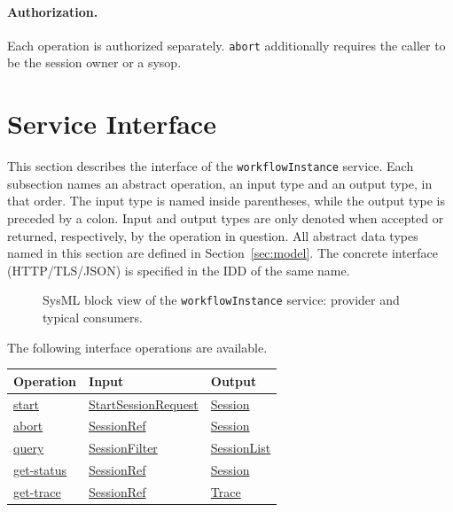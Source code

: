 \documentclass[a4paper]{arrowhead}
\newcommand{\mref}[1]{{\textcolor{ArrowheadPurple}{\hyperref[sec:model:#1]{#1}}}}
\newcommand{\oref}[1]{{\textcolor{ArrowheadBlue}{\hyperref[sec:operations:#1]{#1}}}}
\begin{document}
\paragraph{Authorization.} Each operation is authorized separately. \texttt{abort} additionally requires the caller to be the session owner or a sysop.

\newpage
\section{Service Interface}
\label{sec:operations}
This section describes the interface of the \texttt{workflow\allowbreak{}Instance} service. Each subsection names an abstract operation,
an input type and an output type, in that order. The input type is named inside parentheses, while the output type is
preceded by a colon. Input and output types are only denoted when accepted or returned, respectively, by the operation
in question. All abstract data types named in this section are defined in Section~\ref{sec:model}. The concrete
interface (HTTP/TLS/JSON) is specified in the IDD of the same name.

\begin{figure}[ht!]
  \centering
  \caption{SysML block view of the \texttt{workflowInstance} service: provider and typical consumers.}
  \label{fig:SD}
\end{figure}

The following interface operations are available.

{\small
\begin{longtable}{|p{4.4cm}|p{5.6cm}|p{5.8cm}|}

\hline
\rowcolor{gray!33} Operation & Input & Output \\ \hline
\endhead
\oref{start} & \mref{StartSessionRequest} & \mref{Session} \\ \hline
\oref{abort} & \mref{SessionRef} & \mref{Session} \\ \hline
\oref{query} & \mref{SessionFilter} & \mref{SessionList} \\ \hline
\oref{get-status} & \mref{SessionRef} & \mref{Session} \\ \hline
\oref{get-trace} & \mref{SessionRef} & \mref{Trace} \\ \hline
\end{longtable}
}
\end{document}
